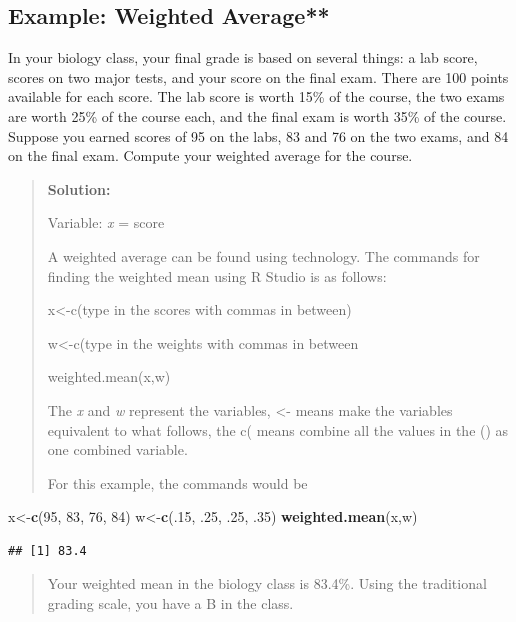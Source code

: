 \documentclass[]{book}
\newenvironment{Shaded}{\begin{snugshade}}{\end{snugshade}}
\newcommand{\DecValTok}[1]{\textcolor[rgb]{0.00,0.00,0.81}{#1}}
\newcommand{\FloatTok}[1]{\textcolor[rgb]{0.00,0.00,0.81}{#1}}
\newcommand{\KeywordTok}[1]{\textcolor[rgb]{0.13,0.29,0.53}{\textbf{#1}}}
\newcommand{\NormalTok}[1]{#1}
\begin{document}
\hypertarget{example-weighted-average}{%
\subsection{Example: Weighted Average**}\label{example-weighted-average}}

In your biology class, your final grade is based on several things: a lab score, scores on two major tests, and your score on the final exam. There are 100 points available for each score. The lab score is worth 15\% of the course, the two exams are worth 25\% of the course each, and the final exam is worth 35\% of the course. Suppose you earned scores of 95 on the labs, 83 and 76 on the two exams, and 84 on the final exam. Compute your weighted average for the course.

\begin{quote}
\textbf{Solution:}

Variable: \emph{x} = score

A weighted average can be found using technology.
The commands for finding the weighted mean using R Studio is as follows:

x\textless{}-c(type in the scores with commas in between)

w\textless{}-c(type in the weights with commas in between

weighted.mean(x,w)

The \emph{x} and \emph{w} represent the variables, \textless{}- means make the variables equivalent to what follows, the c( means combine all the values in the () as one combined variable.

For this example, the commands would be
\end{quote}

\begin{Shaded}
\begin{Highlighting}[]
\NormalTok{x<-}\KeywordTok{c}\NormalTok{(}\DecValTok{95}\NormalTok{, }\DecValTok{83}\NormalTok{, }\DecValTok{76}\NormalTok{, }\DecValTok{84}\NormalTok{)}
\NormalTok{w<-}\KeywordTok{c}\NormalTok{(.}\DecValTok{15}\NormalTok{, }\FloatTok{.25}\NormalTok{, }\FloatTok{.25}\NormalTok{, }\FloatTok{.35}\NormalTok{)}
\KeywordTok{weighted.mean}\NormalTok{(x,w)}
\end{Highlighting}
\end{Shaded}

\begin{verbatim}
## [1] 83.4
\end{verbatim}

\begin{quote}
Your weighted mean in the biology class is 83.4\%. Using the traditional grading scale, you have a B in the class.
\end{quote}
\end{document}
